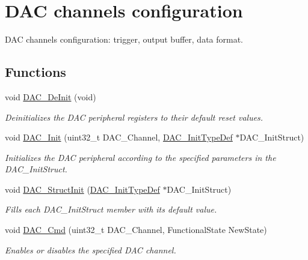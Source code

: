 \hypertarget{group___d_a_c___group1}{}\section{D\+AC channels configuration}
\label{group___d_a_c___group1}


D\+AC channels configuration\+: trigger, output buffer, data format.  


\subsection*{Functions}
\begin{DoxyCompactItemize}
\item 
void \hyperlink{group___d_a_c___group1_ga1fae225204e1e049d6795319e99ba8bc}{D\+A\+C\+\_\+\+De\+Init} (void)
\begin{DoxyCompactList}\small\item\em Deinitializes the D\+AC peripheral registers to their default reset values. \end{DoxyCompactList}\item 
void \hyperlink{group___d_a_c___group1_ga7c59850468ed4bf0659663fe495441da}{D\+A\+C\+\_\+\+Init} (uint32\+\_\+t D\+A\+C\+\_\+\+Channel, \hyperlink{struct_d_a_c___init_type_def}{D\+A\+C\+\_\+\+Init\+Type\+Def} $\ast$D\+A\+C\+\_\+\+Init\+Struct)
\begin{DoxyCompactList}\small\item\em Initializes the D\+AC peripheral according to the specified parameters in the D\+A\+C\+\_\+\+Init\+Struct. \end{DoxyCompactList}\item 
void \hyperlink{group___d_a_c___group1_gadfc270974d54cb5fa5f92556015c4046}{D\+A\+C\+\_\+\+Struct\+Init} (\hyperlink{struct_d_a_c___init_type_def}{D\+A\+C\+\_\+\+Init\+Type\+Def} $\ast$D\+A\+C\+\_\+\+Init\+Struct)
\begin{DoxyCompactList}\small\item\em Fills each D\+A\+C\+\_\+\+Init\+Struct member with its default value. \end{DoxyCompactList}\item 
void \hyperlink{group___d_a_c___group1_ga323e61530d7fa9396c3bce9edb61f733}{D\+A\+C\+\_\+\+Cmd} (uint32\+\_\+t D\+A\+C\+\_\+\+Channel, Functional\+State New\+State)
\begin{DoxyCompactList}\small\item\em Enables or disables the specified D\+AC channel. \end{DoxyCompactList}\item 

\end{DoxyCompactItemize}
